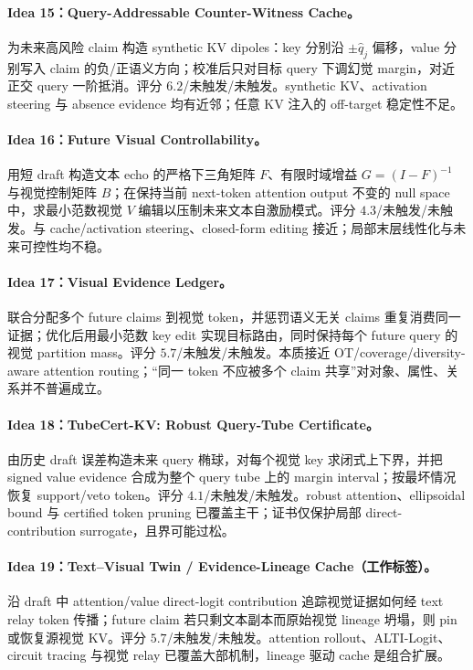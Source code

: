 \documentclass[UTF8,zihao=-4,a4paper]{ctexart}
\begin{document}
\paragraph{Idea 15：Query-Addressable Counter-Witness Cache。}
为未来高风险 claim 构造 synthetic KV dipoles：key 分别沿 $\pm\hat q_j$ 偏移，value 分别写入 claim 的负/正语义方向；校准后只对目标 query 下调幻觉 margin，对近正交 query 一阶抵消。评分 $6.2$/未触发/未触发。synthetic KV、activation steering 与 absence evidence 均有近邻；任意 KV 注入的 off-target 稳定性不足。

\paragraph{Idea 16：Future Visual Controllability。}
用短 draft 构造文本 echo 的严格下三角矩阵 $F$、有限时域增益 $G=(I-F)^{-1}$ 与视觉控制矩阵 $B$；在保持当前 next-token attention output 不变的 null space 中，求最小范数视觉 $V$ 编辑以压制未来文本自激励模式。评分 $4.3$/未触发/未触发。与 cache/activation steering、closed-form editing 接近；局部末层线性化与未来可控性均不稳。

\paragraph{Idea 17：Visual Evidence Ledger。}
联合分配多个 future claims 到视觉 token，并惩罚语义无关 claims 重复消费同一证据；优化后用最小范数 key edit 实现目标路由，同时保持每个 future query 的视觉 partition mass。评分 $5.7$/未触发/未触发。本质接近 OT/coverage/diversity-aware attention routing；“同一 token 不应被多个 claim 共享”对对象、属性、关系并不普遍成立。

\paragraph{Idea 18：TubeCert-KV: Robust Query-Tube Certificate。}
由历史 draft 误差构造未来 query 椭球，对每个视觉 key 求闭式上下界，并把 signed value evidence 合成为整个 query tube 上的 margin interval；按最坏情况恢复 support/veto token。评分 $4.1$/未触发/未触发。robust attention、ellipsoidal bound 与 certified token pruning 已覆盖主干；证书仅保护局部 direct-contribution surrogate，且界可能过松。

\paragraph{Idea 19：Text--Visual Twin / Evidence-Lineage Cache（工作标签）。}
沿 draft 中 attention/value direct-logit contribution 追踪视觉证据如何经 text relay token 传播；future claim 若只剩文本副本而原始视觉 lineage 坍塌，则 pin 或恢复源视觉 KV。评分 $5.7$/未触发/未触发。attention rollout、ALTI-Logit、circuit tracing 与视觉 relay 已覆盖大部机制，lineage 驱动 cache 是组合扩展。
\end{document}
